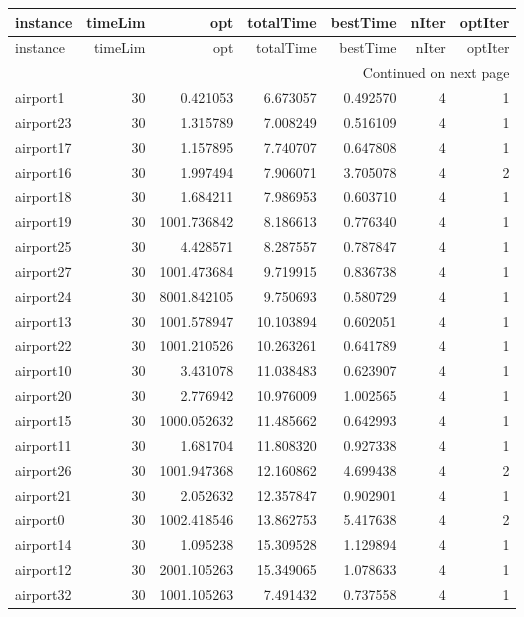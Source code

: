 
\begin{longtable}{|l|r|r|r|r|r|r|}
\toprule
instance & timeLim & opt & totalTime & bestTime & nIter & optIter \\
\midrule
\endfirsthead
\toprule
instance & timeLim & opt & totalTime & bestTime & nIter & optIter \\
\midrule
\endhead
\midrule
\multicolumn{7}{r}{Continued on next page} \\
\midrule
\endfoot
\bottomrule
\endlastfoot
airport1 & 30 & 0.421053 & 6.673057 & 0.492570 & 4 & 1 \\
airport23 & 30 & 1.315789 & 7.008249 & 0.516109 & 4 & 1 \\
airport17 & 30 & 1.157895 & 7.740707 & 0.647808 & 4 & 1 \\
airport16 & 30 & 1.997494 & 7.906071 & 3.705078 & 4 & 2 \\
airport18 & 30 & 1.684211 & 7.986953 & 0.603710 & 4 & 1 \\
airport19 & 30 & 1001.736842 & 8.186613 & 0.776340 & 4 & 1 \\
airport25 & 30 & 4.428571 & 8.287557 & 0.787847 & 4 & 1 \\
airport27 & 30 & 1001.473684 & 9.719915 & 0.836738 & 4 & 1 \\
airport24 & 30 & 8001.842105 & 9.750693 & 0.580729 & 4 & 1 \\
airport13 & 30 & 1001.578947 & 10.103894 & 0.602051 & 4 & 1 \\
airport22 & 30 & 1001.210526 & 10.263261 & 0.641789 & 4 & 1 \\
airport10 & 30 & 3.431078 & 11.038483 & 0.623907 & 4 & 1 \\
airport20 & 30 & 2.776942 & 10.976009 & 1.002565 & 4 & 1 \\
airport15 & 30 & 1000.052632 & 11.485662 & 0.642993 & 4 & 1 \\
airport11 & 30 & 1.681704 & 11.808320 & 0.927338 & 4 & 1 \\
airport26 & 30 & 1001.947368 & 12.160862 & 4.699438 & 4 & 2 \\
airport21 & 30 & 2.052632 & 12.357847 & 0.902901 & 4 & 1 \\
airport0 & 30 & 1002.418546 & 13.862753 & 5.417638 & 4 & 2 \\
airport14 & 30 & 1.095238 & 15.309528 & 1.129894 & 4 & 1 \\
airport12 & 30 & 2001.105263 & 15.349065 & 1.078633 & 4 & 1 \\
airport32 & 30 & 1001.105263 & 7.491432 & 0.737558 & 4 & 1 \\

\end{longtable}
